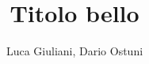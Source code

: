 \documentclass[11pt,a4paper]{report}
\begin{document}
\title{Titolo bello}
\author{Luca Giuliani, Dario Ostuni}
\date{}
\maketitle





\end{document}
